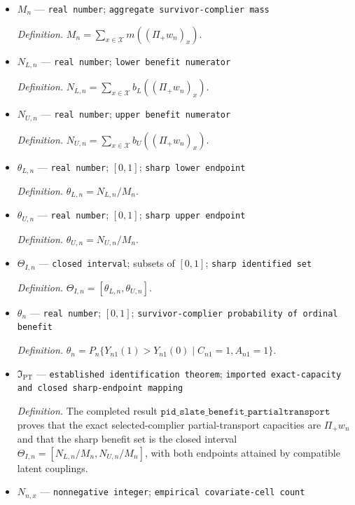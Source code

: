 \documentclass{article}
\begin{document}
\begin{itemize}
  \item \(M_n\) --- \texttt{real number}; \texttt{aggregate survivor-\allowbreak{}complier mass}
  \par\smallskip\noindent\emph{Definition.} \(M_n=\sum_{x\in\mathcal X}m((\Pi_+w_n)_x)\).
  \item \(N_{L,n}\) --- \texttt{real number}; \texttt{lower benefit numerator}
  \par\smallskip\noindent\emph{Definition.} \(N_{L,n}=\sum_{x\in\mathcal X}b_L((\Pi_+w_n)_x)\).
  \item \(N_{U,n}\) --- \texttt{real number}; \texttt{upper benefit numerator}
  \par\smallskip\noindent\emph{Definition.} \(N_{U,n}=\sum_{x\in\mathcal X}b_U((\Pi_+w_n)_x)\).
  \item \(\theta_{L,n}\) --- \texttt{real number}; \([0,1]\); \texttt{sharp lower endpoint}
  \par\smallskip\noindent\emph{Definition.} \(\theta_{L,n}=N_{L,n}/M_n\).
  \item \(\theta_{U,n}\) --- \texttt{real number}; \([0,1]\); \texttt{sharp upper endpoint}
  \par\smallskip\noindent\emph{Definition.} \(\theta_{U,n}=N_{U,n}/M_n\).
  \item \(\Theta_{I,n}\) --- \texttt{closed interval}; subsets of \([0,1]\); \texttt{sharp identified set}
  \par\smallskip\noindent\emph{Definition.} \(\Theta_{I,n}=[\theta_{L,n},\theta_{U,n}]\).
  \item \(\theta_n\) --- \texttt{real number}; \([0,1]\); \texttt{survivor-\allowbreak{}complier probability of ordinal benefit}
  \par\smallskip\noindent\emph{Definition.} \(\theta_n=P_n\{Y_{n1}(1)>Y_{n1}(0)\mid C_{n1}=1,A_{n1}=1\}\).
  \item \(\mathfrak I_{\mathrm{PT}}\) --- \texttt{established identification theorem}; \texttt{imported exact-\allowbreak{}capacity and closed sharp-\allowbreak{}endpoint mapping}
  \par\smallskip\noindent\emph{Definition.} The completed result \(\texttt{pid\_slate\_benefit\_partialtransport}\) proves that the exact selected-complier partial-transport capacities are \(\Pi_+w_n\) and that the sharp benefit set is the closed interval \(\Theta_{I,n}=[N_{L,n}/M_n,N_{U,n}/M_n]\), with both endpoints attained by compatible latent couplings.
  \item \(N_{n,x}\) --- \texttt{nonnegative integer}; \texttt{empirical covariate-\allowbreak{}cell count}

\end{itemize}
\end{document}
